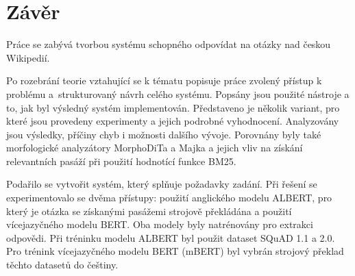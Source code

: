 
\chapter{Závěr}
\label{conclusion}
Práce se zabývá tvorbou systému schopného odpovídat na otázky nad českou Wikipedií.\par

Po rozebrání teorie vztahující se k tématu popisuje práce zvolený přístup k problému a~strukturovaný návrh celého systému. Popsány jsou použité nástroje a to, jak byl výsledný systém implementován. Představeno je několik variant, pro které jsou provedeny experimenty a jejich podrobné vyhodnocení. Analyzovány jsou výsledky, příčiny chyb i možnosti dalšího vývoje. Porovnány byly také morfologické analyzátory MorphoDiTa a Majka a jejich vliv na získání relevantních pasáží při použití hodnotící funkce BM25.\par
\smallskip

Podařilo se vytvořit systém, který splňuje požadavky zadání. Při řešení se experimentovalo se dvěma přístupy: použití anglického modelu ALBERT, pro který je otázka se získanými pasážemi strojově překládána a použití vícejazyčného modelu BERT. Oba modely byly natrénovány pro extrakci odpovědi. Při tréninku modelu ALBERT byl použit dataset SQuAD 1.1 a 2.0. Pro trénink vícejazyčného modelu BERT (mBERT) byl vybrán strojový překlad těchto datasetů do češtiny.\par

